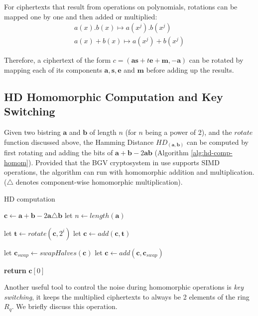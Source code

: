 \begin{description}
  For ciphertexts that result from operations on polynomials, rotations can be mapped one by one and then added or multiplied:
\begin{align*}
  a(x).b(x) \mapsto a(x^{j}).b(x^{j})\\
  a(x) + b(x) \mapsto a(x^{j}) + b(x^{j})
\end{align*}

Therefore, a ciphertext of the form
\(c = (\mathbf{as} + t \mathbf{e} + \mathbf{m}, -\mathbf{a})\) can be rotated by
 mapping each of its components \(\mathbf{a},\mathbf{s},\mathbf{e}\)
and \(\mathbf{m}\) before adding up the results.
\end{description}

\subsection{HD Homomorphic Computation  and Key Switching}
Given two bistring \(\mathbf{a}\) and \(\mathbf{b}\) of length \(n\) (for \(n\)
being a power of 2), and the $rotate$ function discussed above, the Hamming
Distance \(HD_{(\mathbf{a,b})}\) can be computed by first rotating and adding the bits of \(\mathbf{a} + \mathbf{b} - 2\mathbf{ab}\) (Algorithm
\ref{alg:hd-comp-homom}). Provided that the BGV cryptosystem in use supports
SIMD operations, the algorithm can run with homomorphic addition and
multiplication. ($\triangle$ denotes component-wise homomorphic multiplication).

\begin{algorithm}
\caption{HD computation}\label{alg:hd-comp-homom}
\begin{algorithmic}[1]
  \State $\mathbf{c} \gets \mathbf{a} + \mathbf{b} - 2 \mathbf{a} \triangle \mathbf{b}$
  \State let $n \gets length(\mathbf{a})$
  
  \State let $\mathbf{t} \gets rotate(\mathbf{c}, 2^{i})$
  \State let $\mathbf{c} \gets add(\mathbf{c}, \mathbf{t})$

  \EndFor

  \State let $\mathbf{c}_{swap} \gets swapHalves(\mathbf{c})$
  \State let $\mathbf{c} \gets add(\mathbf{c},\mathbf{c}_{swap})$
  
\State \textbf{return} $\mathbf{c}[0]$
\EndProcedure
\end{algorithmic}
\end{algorithm}

Another useful tool to control the noise during homomorphic operations is
\textit{key switching}, it keeps the multiplied ciphertexts to always be 2
elements of the ring $R_{q}$. We briefly discuss this operation.


